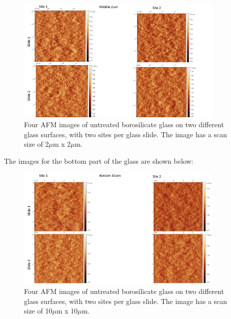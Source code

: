\begin{figure}[h!!!!]     %
        \begin{center}
          \includegraphics[width=100mm]{chapter3/mid 2um.png}
\end{center}
\caption{Four AFM images of untreated borosilicate glass on two different glass surfaces, with two sites per glass slide. The image has a scan size of 2$\mu$m x 2$\mu$m.}
\label{fig:figure9}                 %
\end{figure}   

\newpage
The images for the bottom part of the glass are shown below:

\begin{figure}[h!!!!]     %
        \begin{center}
          \includegraphics[width=100mm]{chapter3/bot 10um.png}
\end{center}
\caption{Four AFM images of untreated borosilicate glass on two different glass surfaces, with two sites per glass slide. The image has a scan size of 10$\mu$m x 10$\mu$m.}
\label{fig:figure9}                 %
\end{figure}   

